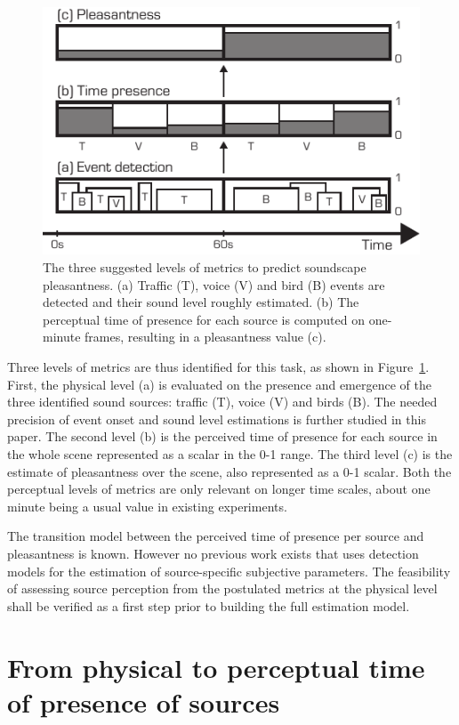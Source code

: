 \documentclass{article}
\begin{document}
\begin{sloppy}
\begin{figure}[t]
  \centering
  \centerline{\includegraphics[width=0.8\columnwidth]{block.pdf}}
  \caption{The three suggested levels of metrics to predict soundscape pleasantness. (a) Traffic (T), voice (V) and bird (B) events are detected and their sound level roughly estimated. (b) The perceptual time of presence for each source is computed on one-minute frames, resulting in a pleasantness value (c).}
  \label{fig:block}
\end{figure}

Three levels of metrics are thus identified for this task, as shown in Figure~\ref{fig:block}. First, the physical level (a) is evaluated on the presence and emergence of the three identified sound sources: traffic (T), voice (V) and birds (B). The needed precision of event onset and sound level estimations is further studied in this paper. The second level (b) is the perceived time of presence for each source in the whole scene represented as a scalar in the 0-1 range. The third level (c) is the estimate of pleasantness over the scene, also represented as a 0-1 scalar. Both the perceptual levels of metrics are only relevant on longer time scales, about one minute being a usual value in existing experiments.

The transition model between the perceived time of presence per source and pleasantness is known. However no previous work exists that uses detection models for the estimation of source-specific subjective parameters. The feasibility of assessing source perception from the postulated metrics at the physical level shall be verified as a first step prior to building the full estimation model.

\section{From physical to perceptual time of presence of sources}
\label{sec:val}


\end{sloppy}
\end{document}
